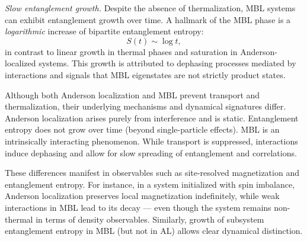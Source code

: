 \emph{Slow entanglement growth.} Despite the absence of thermalization, MBL systems can exhibit entanglement growth over time. A hallmark of the MBL phase is a \emph{logarithmic} increase of bipartite entanglement entropy:
\begin{equation}
S(t) \sim \log t,
\end{equation}
in contrast to linear growth in thermal phases and saturation in Anderson-localized systems. This growth is attributed to dephasing processes mediated by interactions and signals that MBL eigenstates are not strictly product states.



Although both Anderson localization and MBL prevent transport and thermalization, their underlying mechanisms and dynamical signatures differ. Anderson localization arises purely from interference and is static. Entanglement entropy does not grow over time (beyond single-particle effects). MBL is an intrinsically interacting phenomenon. While transport is suppressed, interactions induce dephasing and allow for slow spreading of entanglement and correlations.

These differences manifest in observables such as site-resolved magnetization and entanglement entropy. For instance, in a system initialized with spin imbalance, Anderson localization preserves local magnetization indefinitely, while weak interactions in MBL lead to its decay — even though the system remains non-thermal in terms of density observables. Similarly, growth of subsystem entanglement entropy in MBL (but not in AL) allows clear dynamical distinction.



